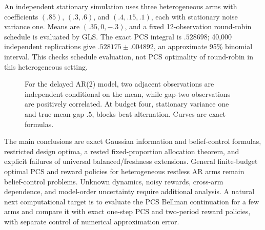 An independent stationary simulation uses three heterogeneous arms with coefficients $(.85)$, $(.3,.6)$, and $(.4,.15,.1)$, each with stationary noise variance one. Means are $(.35,0,-.3)$, and a fixed 12-observation round-robin schedule is evaluated by GLS. The exact PCS integral is $.528698$; 40,000 independent replications give $.528175\pm.004892$, an approximate 95\% binomial interval. This checks schedule evaluation, not PCS optimality of round-robin in this heterogeneous setting.

\begin{figure}[htbp]
\centering
{}
\caption{For the delayed AR(2) model, two adjacent observations are independent conditional on the mean, while gap-two observations are positively correlated. At budget four, stationary variance one and true mean gap $.5$, blocks beat alternation. Curves are exact formulas.}
\end{figure}

The main conclusions are exact Gaussian information and belief-control formulas, restricted design optima, a rested fixed-proportion allocation theorem, and explicit failures of universal balanced/freshness extensions. General finite-budget optimal PCS and reward policies for heterogeneous restless AR arms remain belief-control problems. Unknown dynamics, noisy rewards, cross-arm dependence, and model-order uncertainty require additional analysis. A natural next computational target is to evaluate the PCS Bellman continuation for a few arms and compare it with exact one-step PCS and two-period reward policies, with separate control of numerical approximation error.

